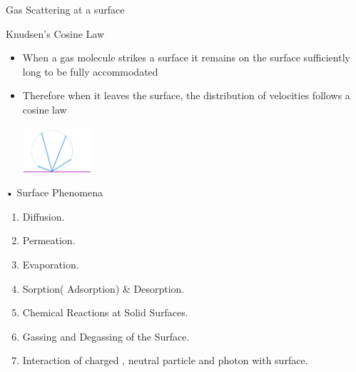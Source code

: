 \documentclass[11]{beamer}
\begin{document}
\begin{frame}{Gas Scattering at a surface}

\begin{exampleblock}{Knudsen's Cosine Law}

\begin{itemize}

\item When a gas molecule strikes a surface it remains on the surface sufficiently long to be fully accommodated

\item Therefore when it leaves the surface, the distribution of velocities follows a cosine law
		
		\begin{center}
			\includegraphics[width=0.2\textwidth]{CosineLawOfScattering.png}
		\end{center}



\end{itemize}


\end{exampleblock}

\end{frame}



\begin{frame}{• Surface Phenomena}

\begin{exampleblock}

\begin{enumerate}
			\item Diffusion.
			\item Permeation.
			\item Evaporation.
			\item Sorption( Adsorption) \& Desorption.
	   	 	\item Chemical Reactions at Solid Surfaces.
			\item Gassing and Degassing of the Surface.
	   	 	
			\item Interaction of charged , neutral particle and photon with surface.
			
	
	\end{enumerate}
\end{exampleblock}


\end{frame}
\end{document}
